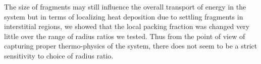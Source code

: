 The size of fragments may still influence the overall transport of energy in the system but in terms of localizing heat deposition due to settling fragments in interstitial regions, we showed that the local packing fraction was changed very little over the range of radius ratios we tested. Thus from the point of view of capturing proper thermo-physics of the system, there does not seem to be a strict sensitivity to choice of radius ratio. 